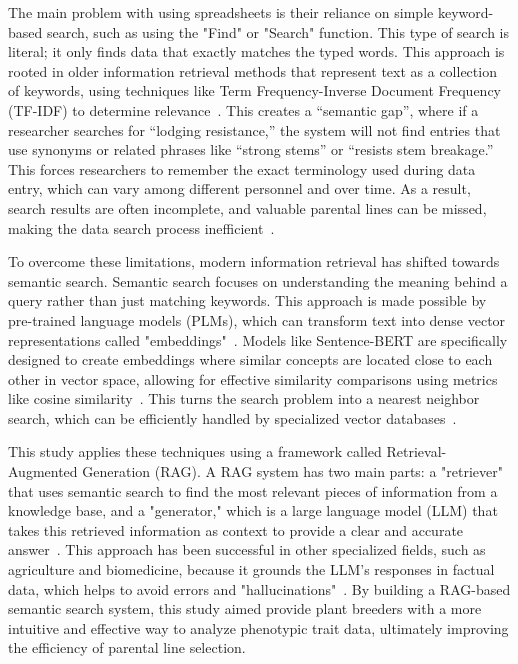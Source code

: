 \documentclass[journal]{./IEEE/IEEEtran}
\begin{document}
The main problem with using spreadsheets is their reliance on simple keyword-based search, such as using the "Find" or "Search" function. This type of search is literal; it only finds data that exactly matches the typed words. This approach is rooted in older information retrieval methods that represent text as a collection of keywords, using techniques like Term Frequency-Inverse Document Frequency (TF-IDF) to determine relevance~\cite{zhao_dense_2024}. This creates a ``semantic gap'', where if a researcher searches for ``lodging resistance,'' the system will not find entries that use synonyms or related phrases like ``strong stems'' or ``resists stem breakage.'' This forces researchers to remember the exact terminology used during data entry, which can vary among different personnel and over time. As a result, search results are often incomplete, and valuable parental lines can be missed, making the data search process inefficient~\cite{garcia_improving_2025}.

To overcome these limitations, modern information retrieval has shifted towards semantic search. Semantic search focuses on understanding the meaning behind a query rather than just matching keywords. This approach is made possible by pre-trained language models (PLMs), which can transform text into dense vector representations called "embeddings"~\cite{mandikal_sparse_2024,zhao_dense_2024}. Models like Sentence-BERT are specifically designed to create embeddings where similar concepts are located close to each other in vector space, allowing for effective similarity comparisons using metrics like cosine similarity~\cite{reimers_sentence-bert_2019}. This turns the search problem into a nearest neighbor search, which can be efficiently handled by specialized vector databases~\cite{zhao_chat2data_2024}.

This study applies these techniques using a framework called Retrieval-Augmented Generation (RAG). A RAG system has two main parts: a "retriever" that uses semantic search to find the most relevant pieces of information from a knowledge base, and a "generator," which is a large language model (LLM) that takes this retrieved information as context to provide a clear and accurate answer~\cite{lewis_retrieval-augmented_2021}. This approach has been successful in other specialized fields, such as agriculture and biomedicine, because it grounds the LLM's responses in factual data, which helps to avoid errors and "hallucinations"~\cite{balaguer_rag_2024,garcia_improving_2025,hier_simplified_2025, soong_improving_2024}. By building a RAG-based semantic search system, this study aimed provide plant breeders with a more intuitive and effective way to analyze phenotypic trait data, ultimately improving the efficiency of parental line selection.
\end{document}
